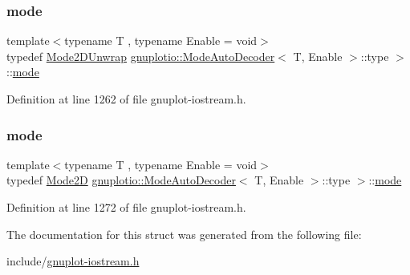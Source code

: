 \subsubsection{\texorpdfstring{mode}{mode}\hspace{0.1cm}{\footnotesize\ttfamily [1/2]}}
{\footnotesize\ttfamily template$<$typename T , typename Enable  = void$>$ \\
typedef \hyperlink{structgnuplotio_1_1_mode2_d_unwrap}{Mode2\+D\+Unwrap} \hyperlink{structgnuplotio_1_1_mode_auto_decoder}{gnuplotio\+::\+Mode\+Auto\+Decoder}$<$ T, Enable $>$\+::type $>$\+::\hyperlink{structgnuplotio_1_1_mode_auto_decoder_1_1type_01_4_ad1942745c810b24503495c6ade6bd9f6}{mode}}



Definition at line 1262 of file gnuplot-\/iostream.\+h.

\mbox{\label{structgnuplotio_1_1_mode_auto_decoder_1_1type_01_4_a07e8af1d93e8107efb7be6fd68b0024c}} 
\subsubsection{\texorpdfstring{mode}{mode}\hspace{0.1cm}{\footnotesize\ttfamily [2/2]}}
{\footnotesize\ttfamily template$<$typename T , typename Enable  = void$>$ \\
typedef \hyperlink{structgnuplotio_1_1_mode2_d}{Mode2D} \hyperlink{structgnuplotio_1_1_mode_auto_decoder}{gnuplotio\+::\+Mode\+Auto\+Decoder}$<$ T, Enable $>$\+::type $>$\+::\hyperlink{structgnuplotio_1_1_mode_auto_decoder_1_1type_01_4_ad1942745c810b24503495c6ade6bd9f6}{mode}}



Definition at line 1272 of file gnuplot-\/iostream.\+h.



The documentation for this struct was generated from the following file\+:\begin{DoxyCompactItemize}
\item 
include/\hyperlink{gnuplot-iostream_8h}{gnuplot-\/iostream.\+h}\end{DoxyCompactItemize}
